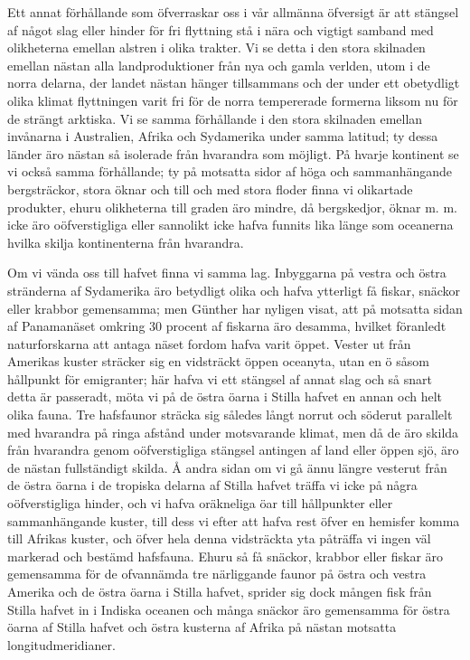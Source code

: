 Ett annat förhållande som öfverraskar oss i vår allmänna öfversigt är att stängsel af något slag eller hinder för fri flyttning stå i nära och vigtigt samband med olikheterna emellan alstren i olika trakter. Vi se detta i den stora skilnaden emellan nästan alla landproduktioner från nya och gamla verlden, utom i de norra delarna, der landet nästan hänger tillsammans och der under ett obetydligt olika klimat flyttningen varit fri för de norra tempererade formerna liksom nu för de strängt arktiska. Vi se samma förhållande i den stora skilnaden emellan invånarna i Australien, Afrika och Sydamerika under samma latitud; ty dessa länder äro nästan så isolerade från hvarandra som möjligt. På hvarje kontinent se vi också samma förhållande; ty på motsatta sidor af höga och sammanhängande bergsträckor, stora öknar och till och med stora floder finna vi olikartade produkter, ehuru olikheterna till graden äro mindre, då bergskedjor, öknar m. m. icke äro oöfverstigliga eller sannolikt icke hafva funnits lika länge som oceanerna hvilka skilja kontinenterna från hvarandra.

Om vi vända oss till hafvet finna vi samma lag. Inbyggarna på vestra och östra stränderna af Sydamerika äro betydligt olika och hafva ytterligt få fiskar, snäckor eller krabbor gemensamma; men Günther har nyligen visat, att på motsatta sidan af Panamanäset omkring 30 procent af fiskarna äro desamma, hvilket föranledt naturforskarna att antaga näset fordom hafva varit öppet. Vester ut från Amerikas kuster sträcker sig en vidsträckt öppen oceanyta, utan en ö såsom hållpunkt för emigranter; här hafva vi ett stängsel af annat slag och så snart detta är passeradt, möta vi på de östra öarna i Stilla hafvet en annan och helt olika fauna. Tre hafsfaunor sträcka sig således långt norrut och söderut parallelt med hvarandra på ringa afstånd under motsvarande klimat, men då de äro skilda från hvarandra genom oöfverstigliga stängsel antingen af land eller öppen sjö, äro de nästan fullständigt skilda. Å andra sidan om vi gå ännu längre vesterut från de östra öarna i de tropiska delarna af Stilla hafvet träffa vi icke på några oöfverstigliga hinder, och vi hafva oräkneliga öar till hållpunkter eller sammanhängande kuster, till dess vi efter att hafva rest öfver en hemisfer komma till Afrikas kuster, och öfver hela denna vidsträckta yta påträffa vi ingen väl markerad och bestämd hafsfauna. Ehuru så få snäckor, krabbor eller fiskar äro gemensamma för de ofvannämda tre närliggande faunor på östra och vestra Amerika och de östra öarna i Stilla hafvet, sprider sig dock mången fisk från Stilla hafvet in i Indiska oceanen och många snäckor äro gemensamma för östra öarna af Stilla hafvet och östra kusterna af Afrika på nästan motsatta longitudmeridianer.

